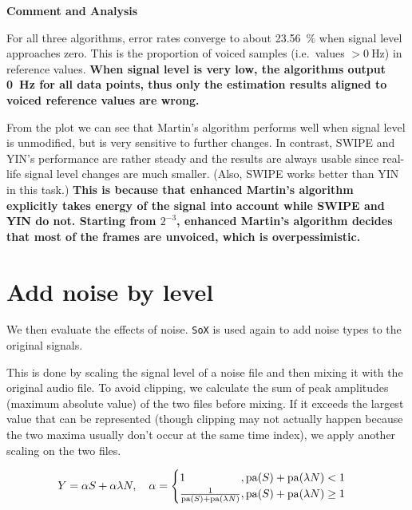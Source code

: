 \documentclass[11pt,a4paper]{report}
\begin{document}
\begin{mdframed}
\textbf{Comment and Analysis}

\bigskip

For all three algorithms, error rates converge to about \SI{23.56}{\percent} when signal level approaches zero.
This is the proportion of voiced samples (i.e.\, values \( > \SI{0}{\hertz} \)) in reference values.
\textbf{When signal level is very low, the algorithms output \SI{0}{\hertz} for all data points, thus only the estimation results aligned to voiced reference values are wrong.}

\bigskip

From the plot we can see that Martin's algorithm performs well when signal level is unmodified, but is very sensitive to further changes.
In contrast, SWIPE and YIN's performance are rather steady and the results are always usable since real-life signal level changes are much smaller.
(Also, SWIPE works better than YIN in this task.) \textbf{This is because that enhanced Martin's algorithm explicitly takes energy of the signal into account while SWIPE and YIN do not.
Starting from \(2^{-3}\), enhanced Martin's algorithm decides that most of the frames are unvoiced, which is overpessimistic.}
\end{mdframed}

\newpage

\section{Add noise by level}

We then evaluate the effects of noise.
\texttt{SoX} is used again to add noise types to the original signals.

This is done by scaling the signal level of a noise file and then mixing it with the original audio file.
To avoid clipping, we calculate the sum of peak amplitudes (maximum absolute value) of the two files before mixing.
If it exceeds the largest value that can be represented (though clipping may not actually happen because the two maxima usually don't occur at the same time index), we apply another scaling on the two files.

\begin{equation}
  Y = \alpha S + \alpha \lambda N, \quad
  \alpha = \begin{cases}
    \mathrlap{1}\hphantom{\frac{1}{\mathrm{pa}(S) + \mathrm{pa}(\lambda N)}}, \mathrm{pa}(S) + \mathrm{pa}(\lambda N) < 1 \\
    \frac{1}{\mathrm{pa}(S) + \mathrm{pa}(\lambda N)}, \mathrm{pa}(S) + \mathrm{pa}(\lambda N) \geq 1
  \end{cases}
\end{equation}
\end{document}
